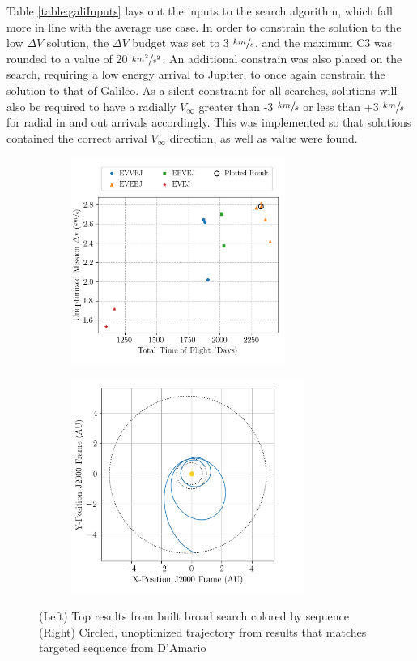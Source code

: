 \documentclass[letterpaper, preprint, paper,11pt]{AAS}	%
\begin{document}
Table \ref*{table:galiInputs} lays out the inputs to the search algorithm, which fall more in line with the average use case. In order to constrain the solution to the low $\Delta V$ solution, the $\Delta V$ budget was set to 3 $\sfrac{km}{s}$, and the maximum C3 was rounded to a value of 20 $\sfrac{km^2}{s^2}$. An additional constrain was also placed on the search, requiring a low energy arrival to Jupiter, to once again constrain the solution to that of Galileo. As a silent constraint for all searches, solutions will also be required to have a radially $V_\infty$ greater than -3 $\sfrac{km}{s}$ or less than +3 $\sfrac{km}{s}$ for radial in and out arrivals accordingly. This was implemented so that solutions contained the correct arrival $V_\infty$ direction, as well as value were found.

\begin{figure}[htb]
    \begin{subfigure}
        \centering\includegraphics[width=2.75in]{./fig/galileoResults.png}
    \end{subfigure}
    \begin{subfigure}
        \centering\includegraphics[width=3in]{./fig/galileoMCTS.png}
    \end{subfigure}
    \caption{(Left) Top results from built broad search colored by sequence\hspace{1em} (Right) Circled, unoptimized trajectory from results that matches targeted sequence from D'Amario \cite{DAmario1992}}
    \label{fig:galiResults}
\end{figure}
\end{document}
